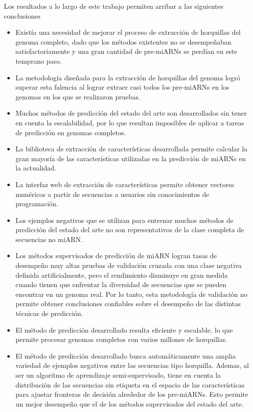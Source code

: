 Los resultados a lo largo de este trabajo permiten arribar a las siguientes conclusiones
\begin{itemize}
\item Existía una necesidad de mejorar el proceso de extracción de horquillas del genoma completo, dado que los métodos existentes no se desempeñaban
	satisfactoriamente y una gran cantidad de pre-miARNs se perdían en este temprano paso.
\item La metodología diseñada para la extracción de horquillas del genoma logró superar esta falencia al lograr extraer casi todos los pre-miARNs en los genomas
	en los que se realizaron pruebas.
\item Muchos métodos de predicción del estado del arte son desarrollados sin tener en cuenta la escalabilidad, por lo que resultan imposibles de aplicar a
	tareas de predicción en genomas completos.
\item La biblioteca de extracción de características desarrollada permite calcular la gran mayoría de las características utilizadas en la predicción de miARNs
	en la actualidad.
\item La interfaz web de extracción de características permite obtener vectores numéricos a partir de secuencias a usuarios sin conocimientos de programación.
\item Los ejemplos negativos que se utilizan para entrenar muchos métodos de predicción del estado del arte no son representativos de la clase completa de
	secuencias no miARN.
\item Los métodos supervisados de predicción de miARN logran tasas de desempeño muy altas pruebas de validación cruzada con una clase negativa definida
	artificialmente, pero el rendimiento disminuye en gran medida cuando tienen que enfrentar la diversidad de secuencias que se pueden encontrar en un
	genoma real. Por lo tanto, esta metodología de validación no permite obtener conclusiones confiables sobre el desempeño de las distintas técnicas de
	predicción.
\item El método de predicción desarrollado resulta eficiente y escalable, lo que permite procesar genomas completos con varios millones de horquillas.
\item El método de predicción desarrollado busca automáticamente una amplia variedad de ejemplos negativos entre las secuencias tipo horquilla. Ademas, al ser
	un algoritmo de aprendizaje semi-supervisado, tiene en cuenta la distribución de las secuencias sin etiqueta en el espacio de las características para
	ajustar fronteras de decisión alrededor de los pre-miARNs. Esto permite un mejor desempeño que el de los métodos supervisados del estado del arte.
\end{itemize}

